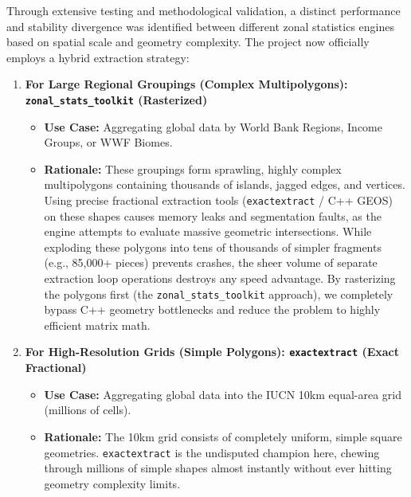 \documentclass[
  letterpaper,
  DIV=11,
  numbers=noendperiod]{scrreprt}
\providecommand{\tightlist}{%
  \setlength{\itemsep}{0pt}\setlength{\parskip}{0pt}}
\begin{document}
Through extensive testing and methodological validation, a distinct
performance and stability divergence was identified between different
zonal statistics engines based on spatial scale and geometry complexity.
The project now officially employs a hybrid extraction strategy:

\begin{enumerate}
\def\labelenumi{\arabic{enumi}.}
\tightlist
\item
  \textbf{For Large Regional Groupings (Complex Multipolygons):
  \texttt{zonal\_stats\_toolkit} (Rasterized)}

  \begin{itemize}
  \tightlist
  \item
    \textbf{Use Case:} Aggregating global data by World Bank Regions,
    Income Groups, or WWF Biomes.
  \item
    \textbf{Rationale:} These groupings form sprawling, highly complex
    multipolygons containing thousands of islands, jagged edges, and
    vertices. Using precise fractional extraction tools
    (\texttt{exactextract} / C++ GEOS) on these shapes causes memory
    leaks and segmentation faults, as the engine attempts to evaluate
    massive geometric intersections. While exploding these polygons into
    tens of thousands of simpler fragments (e.g., 85,000+ pieces)
    prevents crashes, the sheer volume of separate extraction loop
    operations destroys any speed advantage. By rasterizing the polygons
    first (the \texttt{zonal\_stats\_toolkit} approach), we completely
    bypass C++ geometry bottlenecks and reduce the problem to highly
    efficient matrix math.
  \end{itemize}
\item
  \textbf{For High-Resolution Grids (Simple Polygons):
  \texttt{exactextract} (Exact Fractional)}

  \begin{itemize}
  \tightlist
  \item
    \textbf{Use Case:} Aggregating global data into the IUCN 10km
    equal-area grid (millions of cells).
  \item
    \textbf{Rationale:} The 10km grid consists of completely uniform,
    simple square geometries. \texttt{exactextract} is the undisputed
    champion here, chewing through millions of simple shapes almost
    instantly without ever hitting geometry complexity limits.
  \end{itemize}
\end{enumerate}
\end{document}
